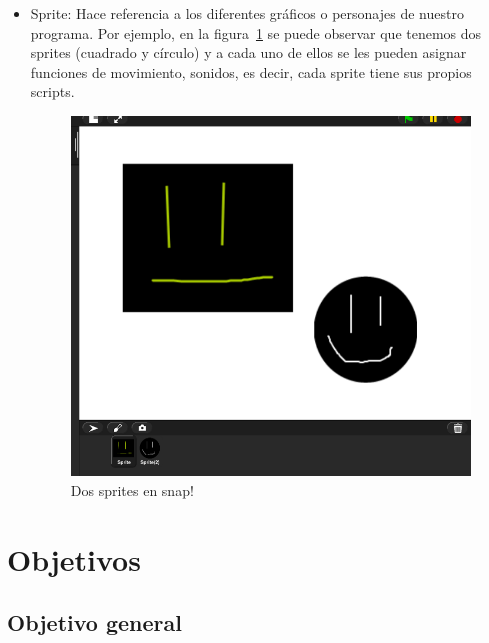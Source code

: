 \documentclass[a4paper, 12pt]{book}
\begin{document}
\begin{itemize}
    \item Sprite: Hace referencia a los diferentes gráficos o personajes de nuestro programa. Por ejemplo, en la figura~\ref{figura:sprites} se puede observar que tenemos dos sprites (cuadrado y círculo) y a cada uno de ellos se les pueden asignar funciones de movimiento, sonidos, es decir, cada sprite tiene sus propios scripts. 
    \begin{figure}[h]
        \centering
        \includegraphics[scale=0.2]{img/sprite.png}
        \caption{Dos sprites en snap!}
        \label{figura:sprites}
    \end{figure}
\end{itemize}


\cleardoublepage %
\chapter{Objetivos} %
\label{chap:objetivos} %

\section{Objetivo general} %
\label{sec:objetivo-general} %
\end{document}
